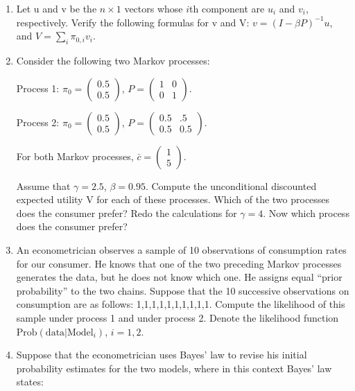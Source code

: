 \documentclass[11pt]{article}
\begin{document}
\begin{enumerate}
    \item Let u and v be the \(n\times1\) vectors whose \(i\)th component are \(u_i\) and \(v_i\), respectively. Verify the following formulas for v and V: \(v = (I-\beta P)^{-1}u\), and \(V = \sum_i\pi_{0,i}v_i\).

    \item Consider the following two Markov processes:

    Process 1: \(\pi_0=\begin{pmatrix}
        0.5 \\
        0.5
    \end{pmatrix}\), \(P=\begin{pmatrix}
        1 & 0\\
        0 & 1
    \end{pmatrix}\).

    Process 2: \(\pi_0=\begin{pmatrix}
        0.5 \\
        0.5
    \end{pmatrix}\), \(P=\begin{pmatrix}
        0.5 & .5\\
        0.5 & 0.5
    \end{pmatrix}\).

    For both Markov processes, \(\bar{c}=\begin{pmatrix}
        1 \\
        5
    \end{pmatrix}\).

    Assume that \(\gamma=2.5\), \(\beta=0.95\). Compute the unconditional discounted expected utility V for each of these processes. Which of the two processes does the consumer prefer? Redo the calculations for \(\gamma=4\). Now which process does the consumer prefer?
    \item An econometrician observes a sample of 10 observations of consumption rates for our consumer. He knows that one of the two preceding Markov processes generates the data, but he does not know which one. He assigns equal “prior probability” to the two chains. Suppose that the 10 successive observations on consumption are as follows: 1,1,1,1,1,1,1,1,1,1. Compute the likelihood of this sample under process 1 and under process 2. Denote the likelihood function \(\text{Prob}(\text{data}|\text{Model}_i)\), \(i=1,2\).

    \item Suppose that the econometrician uses Bayes’ law to revise his initial probability estimates for the two models, where in this context Bayes’ law states:


\end{enumerate}
\end{document}
